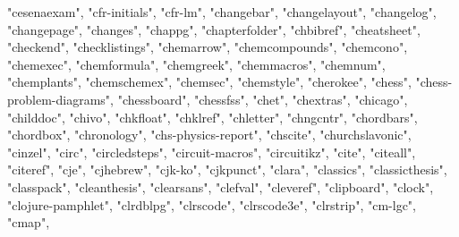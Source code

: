 \documentclass[
]{article}
\newenvironment{Shaded}{\begin{snugshade}}{\end{snugshade}}
\newcommand{\NormalTok}[1]{#1}
\newcommand{\StringTok}[1]{\textcolor[rgb]{0.31,0.60,0.02}{#1}}
\begin{document}
\begin{Shaded}
\begin{Highlighting}[]
\StringTok{"cesenaexam"}\NormalTok{, }\StringTok{"cfr{-}initials"}\NormalTok{, }\StringTok{"cfr{-}lm"}\NormalTok{, }\StringTok{"changebar"}\NormalTok{, }\StringTok{"changelayout"}\NormalTok{, }
\StringTok{"changelog"}\NormalTok{, }\StringTok{"changepage"}\NormalTok{, }\StringTok{"changes"}\NormalTok{, }\StringTok{"chappg"}\NormalTok{, }\StringTok{"chapterfolder"}\NormalTok{, }
\StringTok{"chbibref"}\NormalTok{, }\StringTok{"cheatsheet"}\NormalTok{, }\StringTok{"checkend"}\NormalTok{, }\StringTok{"checklistings"}\NormalTok{, }\StringTok{"chemarrow"}\NormalTok{, }
\StringTok{"chemcompounds"}\NormalTok{, }\StringTok{"chemcono"}\NormalTok{, }\StringTok{"chemexec"}\NormalTok{, }\StringTok{"chemformula"}\NormalTok{, }\StringTok{"chemgreek"}\NormalTok{, }
\StringTok{"chemmacros"}\NormalTok{, }\StringTok{"chemnum"}\NormalTok{, }\StringTok{"chemplants"}\NormalTok{, }\StringTok{"chemschemex"}\NormalTok{, }\StringTok{"chemsec"}\NormalTok{, }
\StringTok{"chemstyle"}\NormalTok{, }\StringTok{"cherokee"}\NormalTok{, }\StringTok{"chess"}\NormalTok{, }\StringTok{"chess{-}problem{-}diagrams"}\NormalTok{, }\StringTok{"chessboard"}\NormalTok{, }
\StringTok{"chessfss"}\NormalTok{, }\StringTok{"chet"}\NormalTok{, }\StringTok{"chextras"}\NormalTok{, }\StringTok{"chicago"}\NormalTok{, }\StringTok{"childdoc"}\NormalTok{, }\StringTok{"chivo"}\NormalTok{, }
\StringTok{"chkfloat"}\NormalTok{, }\StringTok{"chklref"}\NormalTok{, }\StringTok{"chletter"}\NormalTok{, }\StringTok{"chngcntr"}\NormalTok{, }\StringTok{"chordbars"}\NormalTok{, }\StringTok{"chordbox"}\NormalTok{, }
\StringTok{"chronology"}\NormalTok{, }\StringTok{"chs{-}physics{-}report"}\NormalTok{, }\StringTok{"chscite"}\NormalTok{, }\StringTok{"churchslavonic"}\NormalTok{, }
\StringTok{"cinzel"}\NormalTok{, }\StringTok{"circ"}\NormalTok{, }\StringTok{"circledsteps"}\NormalTok{, }\StringTok{"circuit{-}macros"}\NormalTok{, }\StringTok{"circuitikz"}\NormalTok{, }
\StringTok{"cite"}\NormalTok{, }\StringTok{"citeall"}\NormalTok{, }\StringTok{"citeref"}\NormalTok{, }\StringTok{"cje"}\NormalTok{, }\StringTok{"cjhebrew"}\NormalTok{, }\StringTok{"cjk{-}ko"}\NormalTok{, }\StringTok{"cjkpunct"}\NormalTok{, }
\StringTok{"clara"}\NormalTok{, }\StringTok{"classics"}\NormalTok{, }\StringTok{"classicthesis"}\NormalTok{, }\StringTok{"classpack"}\NormalTok{, }\StringTok{"cleanthesis"}\NormalTok{, }
\StringTok{"clearsans"}\NormalTok{, }\StringTok{"clefval"}\NormalTok{, }\StringTok{"cleveref"}\NormalTok{, }\StringTok{"clipboard"}\NormalTok{, }\StringTok{"clock"}\NormalTok{, }\StringTok{"clojure{-}pamphlet"}\NormalTok{, }
\StringTok{"clrdblpg"}\NormalTok{, }\StringTok{"clrscode"}\NormalTok{, }\StringTok{"clrscode3e"}\NormalTok{, }\StringTok{"clrstrip"}\NormalTok{, }\StringTok{"cm{-}lgc"}\NormalTok{, }\StringTok{"cmap"}\NormalTok{, }

\end{Highlighting}
\end{Shaded}
\end{document}
